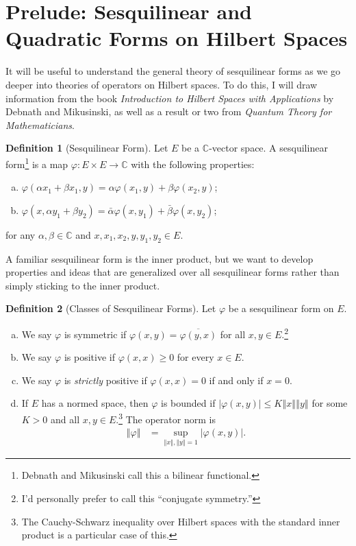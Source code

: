 \documentclass[12pt]{extarticle}
\newcommand{\C}{\mathbb{C}}
\newcommand{\norm}[1]{\left\Vert #1\right\Vert}
\theoremstyle{plain}
\theoremstyle{definition}
\newtheorem*{definition}{Definition}
\theoremstyle{remark}
\begin{document}
  \section{Prelude: Sesquilinear and Quadratic Forms on Hilbert Spaces}%
  It will be useful to understand the general theory of sesquilinear forms as we go deeper into theories of operators on Hilbert spaces. To do this, I will draw information from the book \textit{Introduction to Hilbert Spaces with Applications} by Debnath and Mikusinski, as well as a result or two from \textit{Quantum Theory for Mathematicians}.

  \begin{definition}[Sesquilinear Form]
    Let $E$ be a $\C$-vector space. A sesquilinear form\footnote{Debnath and Mikusinski call this a bilinear functional.} is a map $\varphi: E\times E \rightarrow \C$ with the following properties:
    \begin{enumerate}[(a)]
      \item $\displaystyle \varphi(\alpha x_1 + \beta x_1,y) = \alpha \varphi(x_1,y) + \beta\varphi(x_2,y)$;
      \item $\displaystyle \varphi(x,\alpha y_1 + \beta y_2) = \bar{\alpha}\varphi(x,y_1) + \bar{\beta}\varphi(x,y_2)$;
    \end{enumerate}
    for any $\alpha,\beta \in \C$ and $x,x_1,x_2,y,y_1,y_2 \in E$.
  \end{definition}
  A familiar sesquilinear form is the inner product, but we want to develop properties and ideas that are generalized over all sesquilinear forms rather than simply sticking to the inner product.
  \begin{definition}[Classes of Sesquilinear Forms]
    Let $\varphi$ be a sesquilinear form on $E$.
    \begin{enumerate}[(a)]
      \item We say $\varphi$ is symmetric if $\varphi(x,y) = \overline{\varphi(y,x)}$ for all $x,y\in E$.\footnote{I'd personally prefer to call this ``conjugate symmetry.''}
      \item We say $\varphi$ is positive if $\varphi(x,x) \geq 0$ for every $x\in E$.
      \item We say $\varphi$ is \textit{strictly} positive if $\varphi(x,x) = 0 $ if and only if $x = 0$.
      \item If $E$ has a normed space, then $\varphi$ is bounded if $|\varphi(x,y)| \leq K\norm{x}\norm{y}$ for some $K > 0$ and all $x,y\in E$.\footnote{The Cauchy-Schwarz inequality over Hilbert spaces with the standard inner product is a particular case of this.} The operator norm is
        \begin{align*}
          \norm{\varphi} &= \sup_{\norm{x},\norm{y} = 1}\left\vert \varphi(x,y) \right\vert.
        \end{align*}
    \end{enumerate}
  \end{definition}
\end{document}
